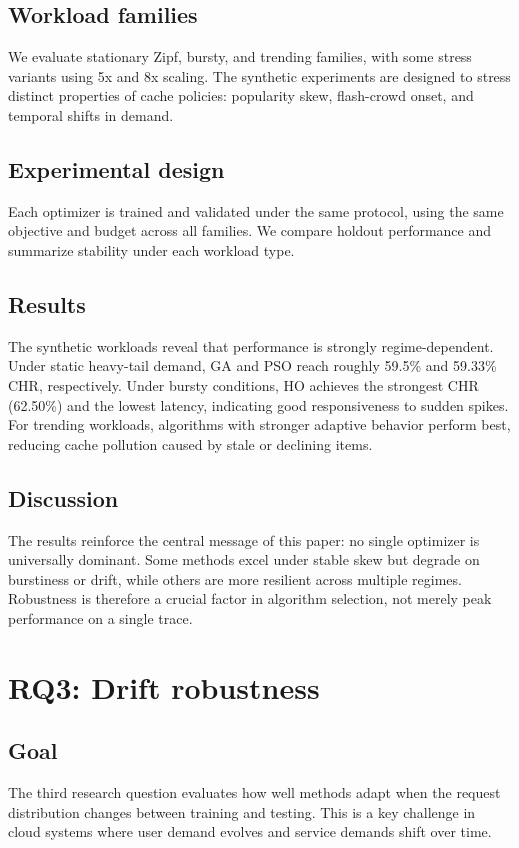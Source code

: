 \documentclass[10pt,journal,compsoc]{IEEEtran}
\begin{document}
\subsection{Workload families}
We evaluate stationary Zipf, bursty, and trending families, with some stress variants using 5x and 8x scaling. The synthetic experiments are designed to stress distinct properties of cache policies: popularity skew, flash-crowd onset, and temporal shifts in demand.

\subsection{Experimental design}
Each optimizer is trained and validated under the same protocol, using the same objective and budget across all families. We compare holdout performance and summarize stability under each workload type.

\subsection{Results}
The synthetic workloads reveal that performance is strongly regime-dependent. Under static heavy-tail demand, GA and PSO reach roughly 59.5\% and 59.33\% CHR, respectively. Under bursty conditions, HO achieves the strongest CHR (62.50\%) and the lowest latency, indicating good responsiveness to sudden spikes. For trending workloads, algorithms with stronger adaptive behavior perform best, reducing cache pollution caused by stale or declining items.

\subsection{Discussion}
The results reinforce the central message of this paper: no single optimizer is universally dominant. Some methods excel under stable skew but degrade on burstiness or drift, while others are more resilient across multiple regimes. Robustness is therefore a crucial factor in algorithm selection, not merely peak performance on a single trace.

\section{RQ3: Drift robustness}
\subsection{Goal}
The third research question evaluates how well methods adapt when the request distribution changes between training and testing. This is a key challenge in cloud systems where user demand evolves and service demands shift over time.
\end{document}
